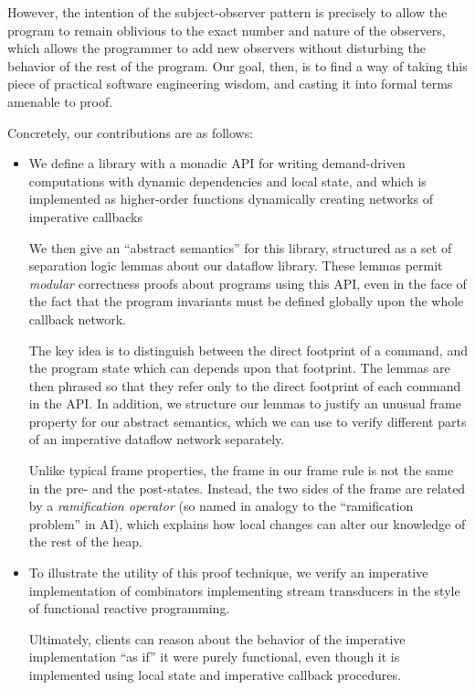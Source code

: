 However, the intention of the subject-observer pattern is
precisely to allow the program to remain oblivious to the exact number
and nature of the observers, which allows the programmer to add new
observers without disturbing the behavior of the rest of the program.
Our goal, then, is to find a way of taking this piece of practical
software engineering wisdom, and casting it into formal terms amenable
to proof.

Concretely, our contributions are as follows: 

\begin{itemize}
  \item We define a library with a monadic API for writing
    demand-driven computations with dynamic dependencies and local
    state, and which is implemented as higher-order functions
    dynamically creating networks of imperative callbacks

    We then give an ``abstract semantics'' for this
    library, structured as a set of separation logic lemmas about our
    dataflow library. These lemmas permit \emph{modular} correctness
    proofs about programs using this API, even in the face of the fact
    that the program invariants must be defined globally upon the
    whole callback network.

    The key idea is to distinguish between the direct footprint of a
    command, and the program state which can depends upon that
    footprint. The lemmas are then phrased so that they refer only to
    the direct footprint of each command in the API. In addition, we
    structure our lemmas to justify an unusual frame property for our
    abstract semantics, which we can use to verify different parts of
    an imperative dataflow network separately.

    Unlike typical frame properties, the frame in our frame rule is
    not the same in the pre- and the post-states. Instead, the two
    sides of the frame are related by a \emph{ramification operator}
    (so named in analogy to the ``ramification problem'' in AI), which
    explains how local changes can alter our knowledge of the rest of
    the heap.

  \item To illustrate the utility of this proof technique, we verify
    an imperative implementation of combinators implementing stream
    transducers in the style of functional reactive programming. 

    Ultimately, clients can reason about the behavior of the imperative
    implementation ``as if'' it were purely functional, even though it
    is implemented using local state and imperative callback
    procedures.
\end{itemize}

